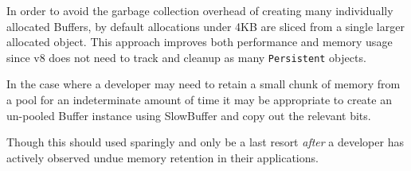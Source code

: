 In order to avoid the garbage collection overhead of creating many
individually allocated Buffers, by default allocations under 4KB are
sliced from a single larger allocated object. This approach improves
both performance and memory usage since v8 does not need to track and
cleanup as many \texttt{Persistent} objects.

In the case where a developer may need to retain a small chunk of memory
from a pool for an indeterminate amount of time it may be appropriate to
create an un-pooled Buffer instance using SlowBuffer and copy out the
relevant bits.

\begin{Shaded}
\begin{Highlighting}[]
 

\NormalTok{(}\NormalTok{, }\NormalTok{() \{}
   \NormalTok{();}
    \NormalTok{(}\NormalTok{);}
  \NormalTok{, }\NormalTok{, }\NormalTok{);}
\NormalTok{\});}
\end{Highlighting}
\end{Shaded}

Though this should used sparingly and only be a last resort \emph{after}
a developer has actively observed undue memory retention in their
applications.
